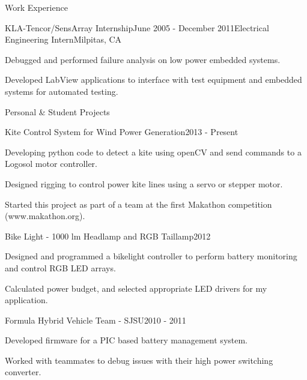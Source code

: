 \documentclass{resume} %
\begin{document}
\begin{rSection}{Work Experience}
\pagebreak[2]
\begin{rSubsection}{KLA-Tencor/SensArray Internship}{June 2005 - December 2011}{Electrical Engineering Intern}{Milpitas, CA}
\item Debugged and performed failure analysis on low power embedded systems. 
\item Developed LabView applications to interface with test equipment and embedded systems for automated testing.
\end{rSubsection}
\end{rSection}

\pagebreak[3]
\begin{rSection}{Personal \& Student Projects}

\vspace{-0.5em}
\begin{rProject}{Kite Control System for Wind Power Generation}{2013 - Present}
\item Developing python code to detect a kite using openCV and send commands to a Logosol motor controller.
\item Designed rigging to control power kite lines using a servo or stepper motor.
\item Started this project as part of a team at the first Makathon competition (www.makathon.org).
\end{rProject}

\vspace{-0.5em}
\begin{rProject}{Bike Light - 1000 lm Headlamp and RGB Taillamp}{2012}
\item Designed and programmed a bikelight controller to perform battery monitoring and control RGB LED arrays.
\item Calculated power budget, and selected appropriate LED drivers for my application.
\end{rProject}
\vspace{-0.5em}

\begin{rProject}{Formula Hybrid Vehicle Team - SJSU}{2010 - 2011}
\item Developed firmware for a PIC based battery management system.
\item Worked with teammates to debug issues with their high power switching converter.
\end{rProject}
\end{rSection}
\end{document}
